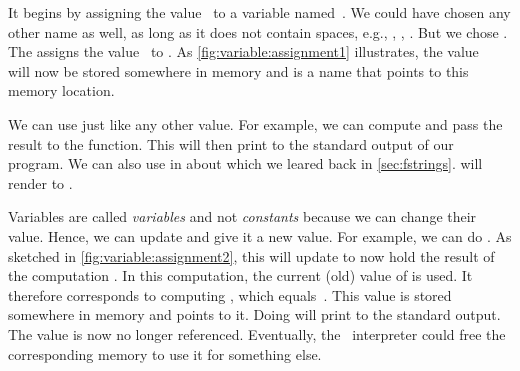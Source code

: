 It begins by assigning the  value~ to a variable named~.
We could have chosen any other name as well, as long as it does not contain spaces, e.g., , , .
But we chose .
The \pythonilIdx{=} assigns the value~ to .
As \cref{fig:variable:assignment1} illustrates, the value~ will now be stored somewhere in memory and  is a name that points to this memory location.%
%
\begin{sloppypar}%
We can use  just like any other value.
For example, we can compute  and pass the result to the  function.
This will then print  to the standard output of our program.
We can also use  in  about which we leared back in \cref{sec:fstrings}.
 will render to .%
\end{sloppypar}%
%
Variables are called \emph{variables} and not \emph{constants} because we can change their value.
Hence, we can update  and give it a new value.
For example, we can do .
As sketched in \cref{fig:variable:assignment2}, this will update  to now hold the result of the computation .
In this computation, the current (old) value of  is used.
It therefore corresponds to computing , which equals~.
This value is stored somewhere in memory and  points to it.
Doing  will print  to the standard output.
The value  is now no longer referenced.
Eventually, the \python\ interpreter could free the corresponding memory to use it for something else.


